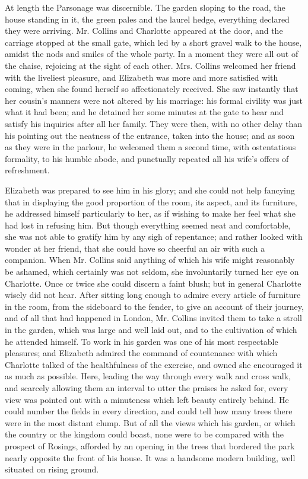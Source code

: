 At length the Parsonage was discernible. The garden sloping to the road, the house standing in it, the green pales and the laurel hedge, everything declared they were arriving. Mr. Collins and Charlotte appeared at the door, and the carriage stopped at the small gate, which led by a short gravel walk to the house, amidst the nods and smiles of the whole party. In a moment they were all out of the chaise, rejoicing at the sight of each other. Mrs. Collins welcomed her friend with the liveliest pleasure, and Elizabeth was more and more satisfied with coming, when she found herself so affectionately received. She saw instantly that her cousin's manners were not altered by his marriage: his formal civility was just what it had been; and he detained her some minutes at the gate to hear and satisfy his inquiries after all her family. They were then, with no other delay than his pointing out the neatness of the entrance, taken into the house; and as soon as they were in the parlour, he welcomed them a second time, with ostentatious formality, to his humble abode, and punctually repeated all his wife's offers of refreshment.

Elizabeth was prepared to see him in his glory; and she could not help fancying that in displaying the good proportion of the room, its aspect, and its furniture, he addressed himself particularly to her, as if wishing to make her feel what she had lost in refusing him. But though everything seemed neat and comfortable, she was not able to gratify him by any sigh of repentance; and rather looked with wonder at her friend, that she could have so cheerful an air with such a companion. When Mr. Collins said anything of which his wife might reasonably be ashamed, which certainly was not seldom, she involuntarily turned her eye on Charlotte. Once or twice she could discern a faint blush; but in general Charlotte wisely did not hear. After sitting long enough to admire every article of furniture in the room, from the sideboard to the fender, to give an account of their journey, and of all that had happened in London, Mr. Collins invited them to take a stroll in the garden, which was large and well laid out, and to the cultivation of which he attended himself. To work in his garden was one of his most respectable pleasures; and Elizabeth admired the command of countenance with which Charlotte talked of the healthfulness of the exercise, and owned she encouraged it as much as possible. Here, leading the way through every walk and cross walk, and scarcely allowing them an interval to utter the praises he asked for, every view was pointed out with a minuteness which left beauty entirely behind. He could number the fields in every direction, and could tell how many trees there were in the most distant clump. But of all the views which his garden, or which the country or the kingdom could boast, none were to be compared with the prospect of Rosings, afforded by an opening in the trees that bordered the park nearly opposite the front of his house. It was a handsome modern building, well situated on rising ground.

